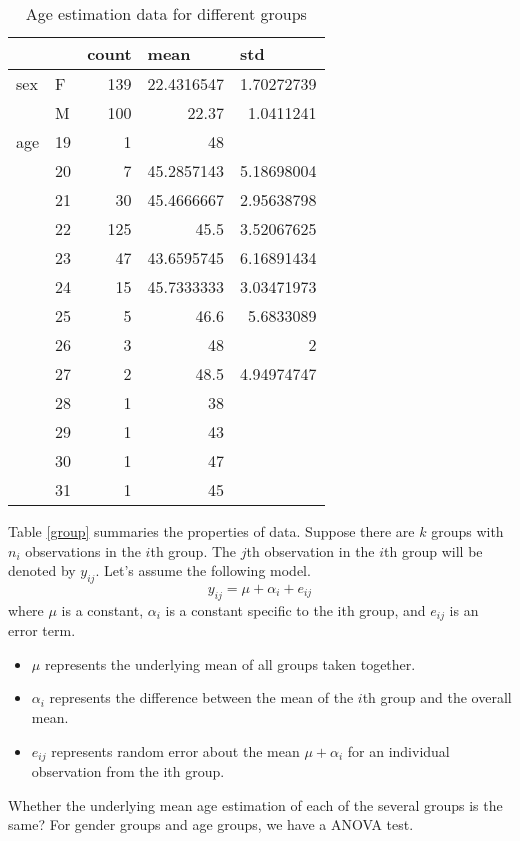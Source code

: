 \documentclass[fancy,11pt,twocol]{elegantbook}
\begin{document}
\begin{table}[htbp]
	\centering
	\caption{Age estimation data for different groups\label{group}}
	  \begin{tabular}{rrrrr}
	  \toprule
			&       & \multicolumn{1}{l}{count} & \multicolumn{1}{l}{mean} & \multicolumn{1}{l}{std} \\
	  \midrule
	  \multicolumn{1}{l}{sex} & \multicolumn{1}{l}{F} & 139   & 22.4316547 & 1.70272739 \\
			& \multicolumn{1}{l}{M} & 100   & 22.37 & 1.0411241 \\
	  \midrule
	  \multicolumn{1}{l}{age} & 19    & 1     & 48    &  \\
			& 20    & 7     & 45.2857143 & 5.18698004 \\
			& 21    & 30    & 45.4666667 & 2.95638798 \\
			& 22    & 125   & 45.5  & 3.52067625 \\
			& 23    & 47    & 43.6595745 & 6.16891434 \\
			& 24    & 15    & 45.7333333 & 3.03471973 \\
			& 25    & 5     & 46.6  & 5.6833089 \\
			& 26    & 3     & 48    & 2 \\
			& 27    & 2     & 48.5  & 4.94974747 \\
			& 28    & 1     & 38    &  \\
			& 29    & 1     & 43    &  \\
			& 30    & 1     & 47    &  \\
			& 31    & 1     & 45    &  \\
	  \bottomrule
	  \end{tabular}%
	\label{tab:addlabel}%
\end{table}%
Table \ref{group} summaries the properties of data. 
Suppose there are $k$ groups with $n_i$ observations in the $i$th group. The $j$th observation in the $i$th group will be denoted by $y_{ij}$. Let’s assume the following model. 
$$
y_{i j}=\mu+\alpha_{i}+e_{i j}
$$
where $\mu$ is a constant, $\alpha_i$ is a constant specific to the ith group, and $e_{ij}$ is an error term.

\begin{note}
	\begin{itemize}
		\item  $\mu$ represents the underlying mean of all groups taken together.
		\item $\alpha_i$ represents the difference between the mean of the $i$th group and the overall mean.
		\item $e_{ij}$ represents random error about the mean $\mu + \alpha_{i}$ for an individual observation from the ith group.		
	\end{itemize}
\end{note}
Whether the underlying mean age estimation of each of the several groups is the same? For gender groups and age groups, we have a ANOVA test.
\end{document}
